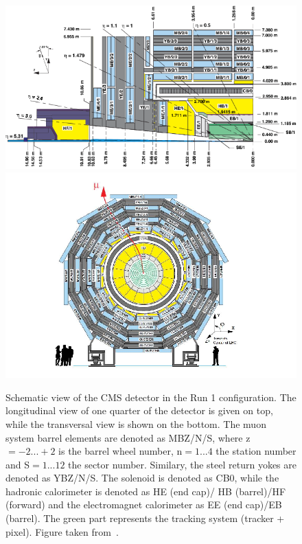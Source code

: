\begin{figure}[htbp]
	\centering
	\includegraphics[width=1.\linewidth]{2_ExperimentalSetup/Figures/cmsview1}
	\includegraphics[width=1.\linewidth]{2_ExperimentalSetup/Figures/cmsview}
 \caption{Schematic view of the CMS detector in the Run 1 configuration. The longitudinal view of one quarter of the detector is given on top, while the transversal view is shown on the bottom. The muon system barrel elements are denoted as MBZ/N/S, where z$=-2...+2$ is the barrel wheel number, n$=1...4$ the station number and S$=1...12$ the sector number. Similary, the steel return yokes are denoted as YBZ/N/S. The solenoid is denoted as CB0, while the hadronic calorimeter is denoted as HE (end cap)/ HB (barrel)/HF (forward) and the electromagnet calorimeter as EE (end cap)/EB (barrel). The green part represents the tracking system (tracker + pixel). Figure taken from~\cite{Chatrchyan:1223944}.}
	\label{fig:CMSview}
\end{figure}


